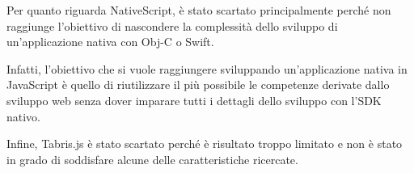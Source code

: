 Per quanto riguarda NativeScript, è stato scartato principalmente perché non raggiunge l'obiettivo di nascondere la complessità dello sviluppo di un'applicazione nativa con Obj-C o Swift.

Infatti, l'obiettivo che si vuole raggiungere sviluppando un'applicazione nativa in JavaScript è quello di riutilizzare il più possibile le competenze derivate dallo sviluppo web senza dover imparare tutti i dettagli dello sviluppo con l'SDK nativo.

Infine, Tabris.js è stato scartato perché è risultato troppo limitato e non è stato in grado di soddisfare alcune delle caratteristiche ricercate.




